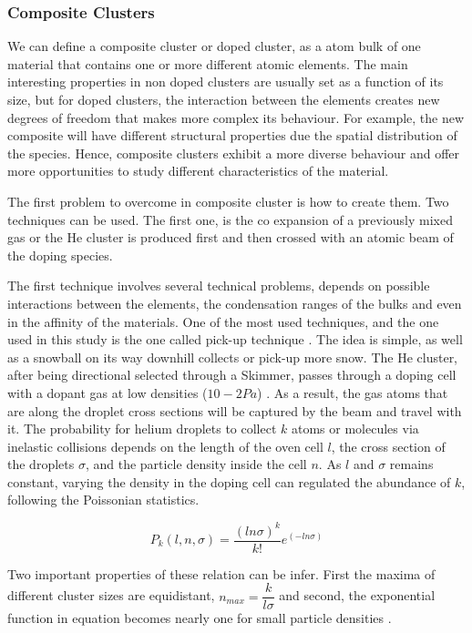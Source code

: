 \subsubsection{Composite Clusters}

We can define a composite cluster or doped cluster, as a atom  bulk of one material that contains one or more different atomic elements. The main interesting properties in non doped clusters are usually set as a function of its size, but for doped clusters, the interaction between the elements creates new degrees of freedom that makes more complex its behaviour. For example, the new composite will have different structural properties due the spatial distribution of the species. Hence, composite clusters exhibit a more diverse behaviour and offer more opportunities to study different characteristics of the material.

The first problem to overcome in composite cluster  is how to create them. Two techniques can be used. The first one, is the co expansion of a previously mixed gas \cite{tchaplyguine_variable_2004} or the He cluster is produced first and then crossed with an atomic beam of the doping species.

The first technique  involves several technical problems, depends on possible interactions between the elements, the condensation ranges of the bulks and even in the  affinity  of the materials. One of the most used techniques, and the one used in this study is the one called pick-up technique \cite{gough_infrared_1985}. The idea is simple, as well as a snowball on its way downhill collects or pick-up more snow. The He cluster, after being directional selected through a Skimmer,  passes through a doping cell with a dopant gas at low densities ($10-2 Pa$)  \cite{stienkemeier_spectroscopy_2006}. As a result, the gas atoms that are along the droplet cross sections will be captured by the beam and travel with it. The probability for helium droplets to collect $k$ atoms or molecules via inelastic collisions depends on the length of the oven cell $l$, the cross section of the droplets $\sigma $, and the particle density inside the cell $n$. As $l$ and $\sigma $ remains constant, varying the density in the doping cell can  regulated the abundance of $k$, following the Poissonian statistics.

\begin{equation}
P_{k}(l,n,\sigma)=\dfrac{(ln\sigma)^{k}}{k!} e^{(-ln\sigma)}
\end{equation}

Two important properties of these relation can be infer. First the maxima of different cluster sizes  are equidistant, $n_{max}=\dfrac{k}{l\sigma}$ and second, the exponential function in equation  becomes  nearly  one for  small  particle  densities \cite{bunermann_modeling_2011}.


